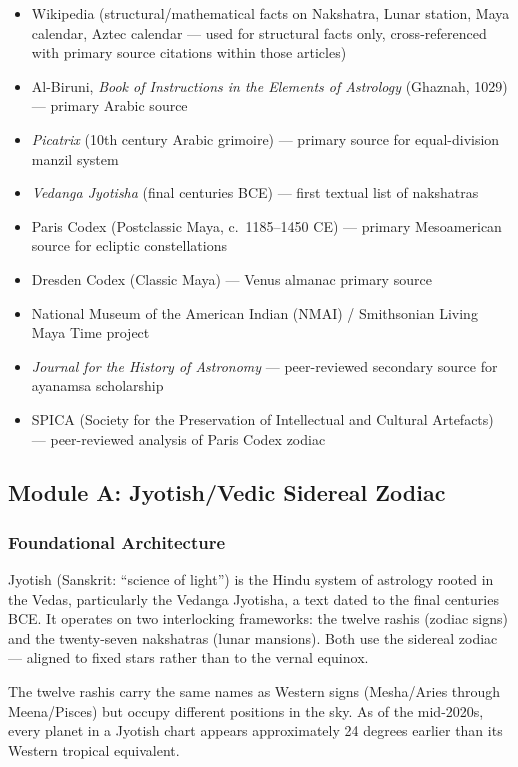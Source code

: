 \documentclass[11pt,letterpaper]{article}
\begin{document}
\begin{itemize}[leftmargin=1.5em]
  \item Wikipedia (structural/mathematical facts on Nakshatra, Lunar station, Maya calendar, Aztec calendar --- used for structural facts only, cross-referenced with primary source citations within those articles)
  \item Al-Biruni, \textit{Book of Instructions in the Elements of Astrology} (Ghaznah, 1029) --- primary Arabic source
  \item \textit{Picatrix} (10th century Arabic grimoire) --- primary source for equal-division manzil system
  \item \textit{Vedanga Jyotisha} (final centuries BCE) --- first textual list of nakshatras
  \item Paris Codex (Postclassic Maya, c.~1185--1450 CE) --- primary Mesoamerican source for ecliptic constellations
  \item Dresden Codex (Classic Maya) --- Venus almanac primary source
  \item National Museum of the American Indian (NMAI) / Smithsonian Living Maya Time project
  \item \textit{Journal for the History of Astronomy} --- peer-reviewed secondary source for ayanamsa scholarship
  \item SPICA (Society for the Preservation of Intellectual and Cultural Artefacts) --- peer-reviewed analysis of Paris Codex zodiac
\end{itemize}

\subsection{Module A: Jyotish/Vedic Sidereal Zodiac}

\subsubsection{Foundational Architecture}

Jyotish (Sanskrit: ``science of light'') is the Hindu system of astrology rooted in the Vedas, particularly the Vedanga Jyotisha, a text dated to the final centuries BCE. It operates on two interlocking frameworks: the twelve rashis (zodiac signs) and the twenty-seven nakshatras (lunar mansions). Both use the sidereal zodiac --- aligned to fixed stars rather than to the vernal equinox.

The twelve rashis carry the same names as Western signs (Mesha/Aries through Meena/Pisces) but occupy different positions in the sky. As of the mid-2020s, every planet in a Jyotish chart appears approximately 24 degrees earlier than its Western tropical equivalent.
\end{document}
